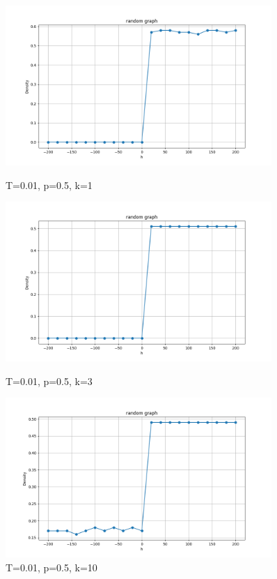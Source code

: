 \documentclass[11pt]{book}
\begin{document}
\begin{figure}
    \centering
    \begin{minipage}{0.45\textwidth}
        \centering
        \includegraphics[width=0.9\textwidth]{rg_T=0.01,p=0.5,k=1.png} %
        \caption{T=0.01, p=0.5, k=1}
        \label{fig26}
    \end{minipage}\hfill
    \begin{minipage}{0.45\textwidth}
        \centering
        \includegraphics[width=0.9\textwidth]{rg,T=0.01,p=0.5,k=3.png} %
        \caption{T=0.01, p=0.5, k=3}
        \label{fig27}
    \end{minipage}
    \begin{minipage}{0.45\textwidth}
        \centering
        \includegraphics[width=0.9\textwidth]{rg,T=0.01,p=0.5,k=10.png} %
        \caption{T=0.01, p=0.5, k=10}
        \label{fig28}
    \end{minipage}\hfill
\end{figure}
\end{document}
